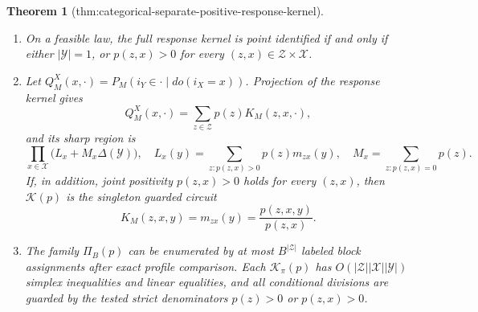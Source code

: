\documentclass{article}
\newtheorem{theorem}{Theorem}
\begin{document}
\begin{theorem}[thm:categorical-separate-positive-response-kernel]
\begin{enumerate}
\(z\) having profile \(\rho\).  If \(\lvert\mathcal Y\rvert\geq2\), then
\[
 B_{\mathrm{sat}}(p)
 =R+\sum_{\rho:H_\rho\ne\varnothing}
 \bigl(\lvert\{z:\rho_z=\rho\}\rvert-1\bigr)
\]
is the least hidden-alphabet cardinality for which every missing
\((z,x)\) response row can vary independently.  More precisely, for
\[
 \mathcal K_{\mathrm{ind}}(p)
 =\left\{k:
 \begin{array}{ll}
 k(z,x,\cdot)=m_{zx},&e_z(x)>0,\\
 k(z,x,\cdot)\in\Delta(\mathcal Y)\text{ independently},&e_z(x)=0,
 \end{array}\right\},
\]
the region with hidden cardinality \(b\) equals
\(\mathcal K_{\mathrm{ind}}(p)\) for every
\(b\geq B_{\mathrm{sat}}(p)\), and is a strict subset for
\(R\leq b<B_{\mathrm{sat}}(p)\).  Intermediate cardinalities give exactly
the displayed finite union of profile-refinement polytopes.
\item On a feasible law, the full response kernel is point identified if
and only if either \(\lvert\mathcal Y\rvert=1\), or
\(p(z,x)>0\) for every \((z,x)\in\mathcal Z\times\mathcal X\).
\item Let \(Q_M^X(x,\cdot)=P_M(i_Y\in\cdot\mid do(i_X=x))\).  Projection
of the response kernel gives
\[
 Q_M^X(x,\cdot)=\sum_{z\in\mathcal Z}p(z)K_M(z,x,\cdot),
\]
and its sharp region is
\[
 \prod_{x\in\mathcal X}\bigl(L_x+M_x\Delta(\mathcal Y)\bigr),
 \quad
 L_x(y)=\sum_{z:p(z,x)>0}p(z)m_{zx}(y),
 \quad
 M_x=\sum_{z:p(z,x)=0}p(z).
\]
If, in addition, joint positivity \(p(z,x)>0\) holds for every
\((z,x)\), then \(\mathcal K(p)\) is the singleton guarded circuit
\[
 K_M(z,x,y)=m_{zx}(y)=\frac{p(z,x,y)}{p(z,x)}.
\]
\item The family \(\Pi_B(p)\) can be enumerated by at most
\(B^{\lvert\mathcal Z\rvert}\) labeled block assignments after exact
profile comparison.  Each \(\mathcal K_\pi(p)\) has
\(O(\lvert\mathcal Z\rvert\lvert\mathcal X\rvert
\lvert\mathcal Y\rvert)\) simplex inequalities and linear equalities,
and all conditional divisions are guarded by the tested strict
denominators \(p(z)>0\) or \(p(z,x)>0\).
\end{enumerate}
\end{theorem}
\end{document}
